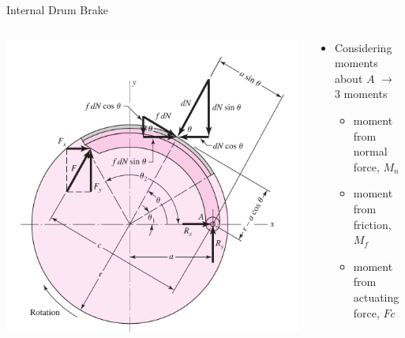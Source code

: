 \documentclass[10pt, svgnames]{beamer}
\begin{document}
\begin{frame}[label={sec:orgb715448}]{Internal Drum Brake}
\begin{columns}
\begin{column}{0.6\columnwidth}
\begin{center}
\includegraphics[width=1.1\textwidth]{./pictures/internal-drum-brake.png}
\end{center}
\end{column}

\begin{column}{0.4\columnwidth}
\begin{itemize}
\item Considering moments about \(A\) \(\rightarrow\) 3 moments

\begin{itemize}
\item moment from normal force, \(M_{n}\)
\item moment from friction, \(M_{f}\)
\item moment from actuating force, \(Fc\)
\end{itemize}
\end{itemize}
\end{column}
\end{columns}
\end{frame}
\end{document}
